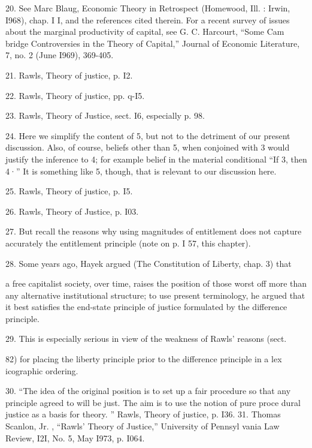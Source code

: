 \documentclass[11pt,openany]{book}
\begin{document}
{20. See Marc Blaug, Economic Theory in Retrospect (Homewood, Ill. : Irwin, I968), chap. I I, and the references cited therein. For a recent survey of issues about the marginal productivity of capital, see G. C. Harcourt, ``Some Cam bridge Controversies in the Theory of Capital,'' Journal of Economic Literature, 7, no. 2 (June I969), 369-405.\par

21. Rawls, Theory of justice, p. I2.\par

22. Rawls, Theory of justice, pp. q-I5.\par

23. Rawls, Theory of Justice, sect. I6, especially p. 98.\par

24. Here we simplify the content of 5, but not to the detriment of our present discussion. Also, of course, beliefs other than 5, when conjoined with 3 would justify the inference to 4; for example belief in the material conditional ``If 3, then 4·'' It is something like 5, though, that is relevant to our discussion here.\par

25. Rawls, Theory of justice, p. I5.\par

26. Rawls, Theory of Justice, p. I03.\par

27. But recall the reasons why using magnitudes of entitlement does not capture accurately the entitlement principle (note on p. I 57, this chapter).\par

28. Some years ago, Hayek argued (The Constitution of Liberty, chap. 3) that\par

a free capitalist society, over time, raises the position of those worst off more than any alternative institutional structure; to use present terminology, he argued that it best satisfies the end-state principle of justice formulated by the difference principle.\par

29. This is especially serious in view of the weakness of Rawls' reasons (sect.\par

82) for placing the liberty principle prior to the difference principle in a lex icographic ordering.\par

30. ``The idea of the original position is to set up a fair procedure so that any principle agreed to will be just. The aim is to use the notion of pure proce dural justice as a basis for theory. '' Rawls, Theory of justice, p. I36. 31. Thomas Scanlon, Jr. , ``Rawls' Theory of Justice,'' University of Pennsyl vania Law Review, I2I, No. 5, May I973, p. I064.\par

}
\end{document}
